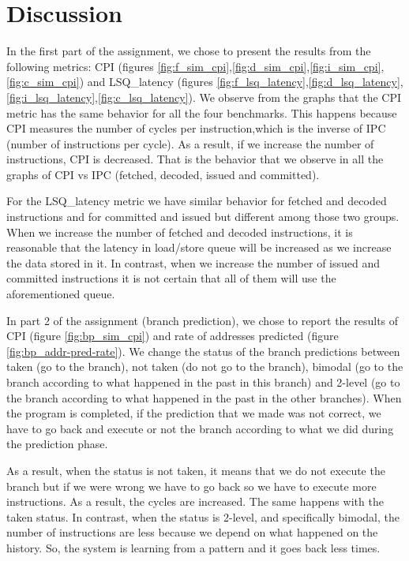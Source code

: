 \documentclass[10pt]{scrartcl}
\begin{document}
\section{Discussion}\label{sec:discussion}
In the first part of the assignment, we chose to present the results from the following metrics: CPI (figures \ref{fig:f_sim_cpi},\ref{fig:d_sim_cpi},\ref{fig:i_sim_cpi},\ref{fig:c_sim_cpi}) and LSQ\_latency (figures \ref{fig:f_lsq_latency},\ref{fig:d_lsq_latency},\ref{fig:i_lsq_latency},\ref{fig:c_lsq_latency}). We observe from the graphs that the CPI metric has the same behavior for all the four benchmarks. This happens because CPI measures the number of cycles per instruction,which is the inverse of IPC (number of instructions per cycle). As a result, if we increase the number of instructions, CPI is decreased. That is the behavior that we observe in all the graphs of CPI vs IPC (fetched, decoded, issued and committed). 
\par For the LSQ\_latency metric we have similar behavior for fetched and decoded instructions and for committed and issued but different among those two groups. When we increase the number of fetched and decoded instructions, it is reasonable that the latency in load/store queue will be increased as we increase the data stored in it. In contrast, when we increase the number of issued and committed instructions it is not certain that all of them will use the aforementioned queue. 
\par In part 2 of the assignment (branch prediction), we chose to report the results of CPI (figure \ref{fig:bp_sim_cpi}) and rate of addresses predicted (figure \ref{fig:bp_addr-pred-rate}). We change the status of the branch predictions between taken (go to the branch), not taken (do not go to the branch), bimodal (go to the branch according to what happened in the past in this branch) and 2-level (go to the branch according to what happened in the past in the other branches). When the program is completed, if the prediction that we made was not correct, we have to go back and execute or not the branch according to what we did during the prediction phase. 
\par As a result, when the status is not taken, it means that we do not execute the branch but if we were wrong we have to go back so we have to execute more instructions. As a result, the cycles are increased. The same happens with the taken status. In contrast, when the status is 2-level, and specifically bimodal, the number of instructions are less because we depend on what happened on the history. So, the system is learning from a pattern and it goes back less times. 
\end{document}
